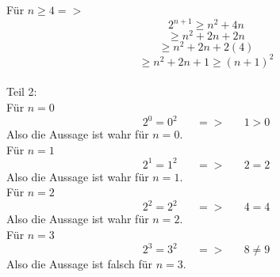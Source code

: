 \documentclass[11pt]{article}
\begin{document}
					Für $n\geq4 =>$ $$2^{n+1} \geq n^2+4n$$
					$$\geq n^2 + 2n + 2n$$
					$$\geq n^2 + 2n + 2(4)$$
					$$\geq n^2 + 2n + 1 \geq (n+1)^2$$\\
				Teil 2:\\
				Für $n=0$	\\
				$$2^0=0^2 \hspace{20pt} => \hspace{20pt} 1>0$$
				Also die Aussage ist wahr für $n=0$.\\
				Für $n=1$	\\
				$$2^1=1^2 \hspace{20pt} => \hspace{20pt} 2=2$$
				Also die Aussage ist wahr für $n=1$.\\
				Für $n=2$	\\
				$$2^2=2^2 \hspace{20pt} => \hspace{20pt} 4=4$$
				Also die Aussage ist wahr für $n=2$.\\
				Für $n=3$	\\
				$$2^3=3^2 \hspace{20pt} => \hspace{20pt} 8 \neq 9$$
				Also die Aussage ist falsch für $n=3$.\\
				
\end{document}
